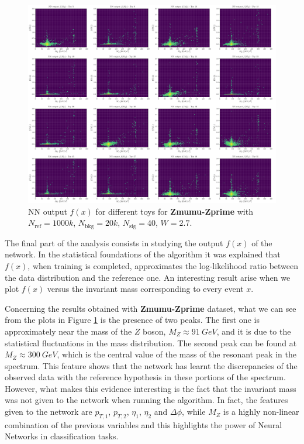 \begin{figure}[H]
	\centering
	\includegraphics[width=1.0\textwidth]{Python/RESULTS/INV_MASS/f_plot_Zprime.pdf}
	\caption{NN output $f(x)$ for different toys for \textbf{Zmumu-Zprime} with $N_\mathrm{ref}=1000\si{k}$, $N_\mathrm{bkg}=20\si{k}$, $N_\mathrm{sig}=40$, $W=2.7$.}
	\label{fig:F_PLOT_Z_PRIME}
\end{figure}

The final part of the analysis consists in studying the output $f(x)$ of the network. In the statistical foundations of the algorithm it was explained that $f(x)$, when training is completed, approximates the log-likelihood ratio between the data distribution and the reference one. An interesting result arise when we plot $f(x)$ versus the invariant mass corresponding to every event $x$.

Concerning the results obtained with \textbf{Zmumu-Zprime} dataset, what we can see from the plots in Figure \ref{fig:F_PLOT_Z_PRIME} is the presence of two peaks. The first one is approximately near the mass of the $Z$ boson, $M_{Z} \approx 91~\si{GeV}$, and it is due to the statistical fluctuations in the mass distribution. The second peak can be found at $M_{Z} \approx 300~\si{GeV}$, which is the central value of the mass of the resonant peak in the spectrum. This feature shows that the network has learnt the discrepancies of the observed data with the reference hypothesis in these portions of the spectrum. However, what makes this evidence interesting is the fact that the invariant mass was not given to the network when running the algorithm. In fact, the features given to the network are $p_{T,1}$, $p_{T,2}$, $\eta_{1}$, $\eta_{2}$ and $\Delta \phi$, while $M_{Z}$ is a highly non-linear combination of the previous variables and this highlights the power of Neural Networks in classification tasks.

